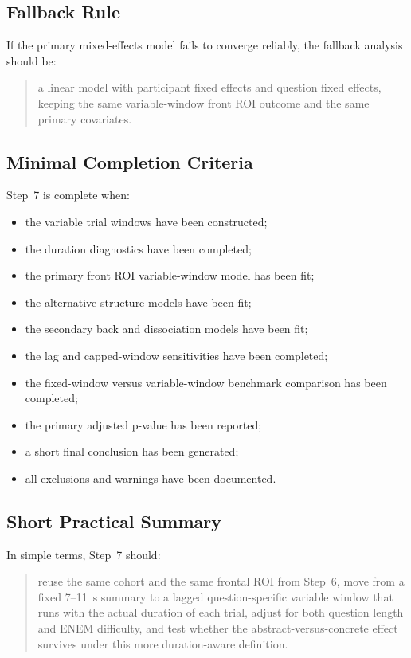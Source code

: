 \documentclass[11pt]{article}
\begin{document}
\subsection{Fallback Rule}
If the primary mixed-effects model fails to converge reliably, the fallback analysis should be:
\begin{quote}
a linear model with participant fixed effects and question fixed effects, keeping the same
variable-window front ROI outcome and the same primary covariates.
\end{quote}

\subsection{Minimal Completion Criteria}
Step~7 is complete when:
\begin{itemize}
    \item the variable trial windows have been constructed;
    \item the duration diagnostics have been completed;
    \item the primary front ROI variable-window model has been fit;
    \item the alternative structure models have been fit;
    \item the secondary back and dissociation models have been fit;
    \item the lag and capped-window sensitivities have been completed;
    \item the fixed-window versus variable-window benchmark comparison has been completed;
    \item the primary adjusted p-value has been reported;
    \item a short final conclusion has been generated;
    \item all exclusions and warnings have been documented.
\end{itemize}

\subsection{Short Practical Summary}
In simple terms, Step~7 should:
\begin{quote}
reuse the same cohort and the same frontal ROI from Step~6, move from a fixed 7--11~s summary
to a lagged question-specific variable window that runs with the actual duration of each trial,
adjust for both question length and ENEM difficulty, and test whether the abstract-versus-concrete
effect survives under this more duration-aware definition.
\end{quote}
\end{document}
